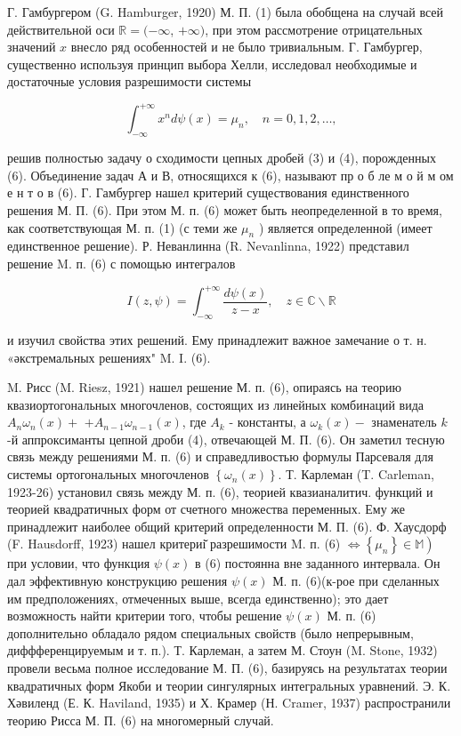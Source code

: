 \documentclass[10pt]{article}
\begin{document}
Г. Гамбургером (G. Hamburger, 1920) М. П. (1) была обобщена на случай всей действительной оси $\mathbb{R}=(-\infty$, $+\infty)$, при этом рассмотрение отрицательных значений $x$ внесло ряд особенностей и не было тривиальным. Г. Гамбургер, существенно используя принцип выбора Хелли, исследовал необходимые и достаточные условия разрешимости системы



\[

\int_{-\infty}^{+\infty} x^{n} d \psi(x)=\mu_{n}, \quad n=0,1,2, \ldots,

\]



решив полностью задачу о сходимости цепных дробей (3) и (4), порожденных (6). Объединение задач А и В, относящихся к (6), называют пр о б ле м о й м ом е н т о в (6). Г. Гамбургер нашел критерий существования единственного решения М. П. (6). При этом М. п. (6) может быть неопределенной в то время, как соответствующая М. п. (1) (с теми же $\mu_{n}$ ) является определенной (имеет единственное решение). Р. Неванлинна (R. Nevanlinna, 1922) представил решение M. п. (6) с помощью интегралов



\[

I(z, \psi)=\int_{-\infty}^{+\infty} \frac{d \psi(x)}{z-x}, \quad z \in \mathbb{C} \backslash \mathbb{R}

\]



и изучил свойства этих решений. Ему принадлежит важное замечание о т. н. «әкстремальных решениях" M. I. (6).



M. Рисс (M. Riesz, 1921) нашел решение М. п. (6), опираясь на теорию квазиортогональных многочленов, состоящих из линейных комбинаций вида $A_{n} \omega_{n}(x)+$ $+A_{n-1} \omega_{n-1}(x)$, где $A_{k}$ - константы, а $\omega_{k}(x)-$ знаменатель $k$-й аппроксиманты цепной дроби (4), отвечающей М. П. (6). Он заметил тесную связь между решениями М. п. (6) и справедливостью формулы Парсеваля для системы ортогональных многочленов $\left\{\omega_{n}(x)\right\}$. Т. Карлеман (T. Carleman, 1923-26) установил связь между М. п. (6), теорией квазианалитич. функций и теорией квадратичных форм от счетного множества переменных. Ему же принадлежит наиболее общий критерий определенности М. П. (6). Ф. Хаусдорф (F. Hausdorff, 1923) нашел критериі̆ разрешимости M. п. (6) $\left.\Longleftrightarrow\left\{\mu_{n}\right\} \in \mathbb{M}\right)$ при условии, что функция $\psi(x)$ в (6) постоянна вне заданного интервала. Он дал эффективную конструкцию решения $\psi(x)$ М. п. (6)(к-рое при сделанных им предположениях, отмеченных выше, всегда единственно); это дает возможность найти критерии того, чтобы решение $\psi(x)$ М. п. (6) дополнительно обладало рядом специальных свойств (было непрерывным, диффференцируемым и т. п.). Т. Карлеман, а затем М. Стоун (M. Stone, 1932) провели весьма полное исследование М. П. (6), базируясь на результатах теории квадратичных форм Якоби и теории сингулярных интегральных уравнений. Э. К. Хәвиленд (Е. К. Haviland, 1935) и Х. Крамер (Н. Cramer, 1937) распространили теорию Рисса М. П. (6) на многомерный случай.
\end{document}
